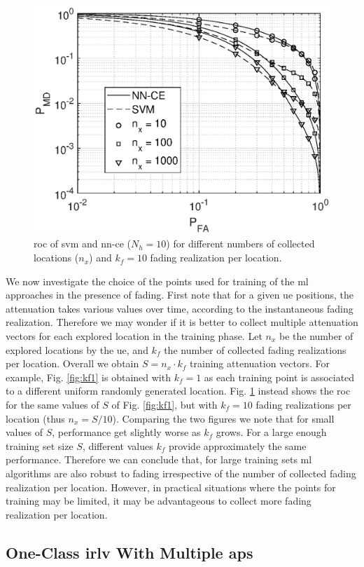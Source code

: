 \documentclass[draftcls,onecolumn,12pt]{IEEEtran}
\begin{document}
\begin{figure}[t]
    \centering
    \includegraphics[width=0.6\columnwidth]{res_avg_nTrain_kf10.eps}
    \caption{\ac{roc} of \ac{svm} and \ac{nn}-\ac{ce} ($N_h = 10$) for different numbers of collected locations ($n_x$) and $k_f=10$ fading realization per location.}
    \label{fig:kf10}
\end{figure}

We now investigate  the choice of the points used for training of the \ac{ml} approaches in the presence of fading. First note that for a given \ac{ue} positions, the attenuation takes various values over time, according to the instantaneous fading realization. Therefore we may wonder if it is better to collect multiple attenuation vectors for each explored location in the training phase.  Let $n_x$ be the number of explored locations by the \ac{ue}, and $k_f$ the number of collected fading realizations per location. Overall we obtain $S = n_x \cdot k_f$ training attenuation vectors. For example, Fig. \ref{fig:kf1} is obtained with $k_f=1$ as each training point is associated to a different uniform randomly generated location. Fig. \ref{fig:kf10} instead shows the \ac{roc} for the same values of $S$ of Fig. \ref{fig:kf1}, but with $k_f=10$ fading realizations per location (thus $n_x = S/10$). Comparing the two figures we note that for small values of $S$, performance get slightly worse as $k_f$ grows. For a large enough training set size $S$, different values $k_f$ provide approximately the same performance.  Therefore we can conclude that, for large training sets \ac{ml} algorithms are also robust to fading irrespective of the number of collected fading realization per location. However, in practical situations where the points for training may be limited, it may be advantageous to collect more fading realization per location. 


\subsection{One-Class \ac{irlv} With Multiple \acp{ap}}
\end{document}
